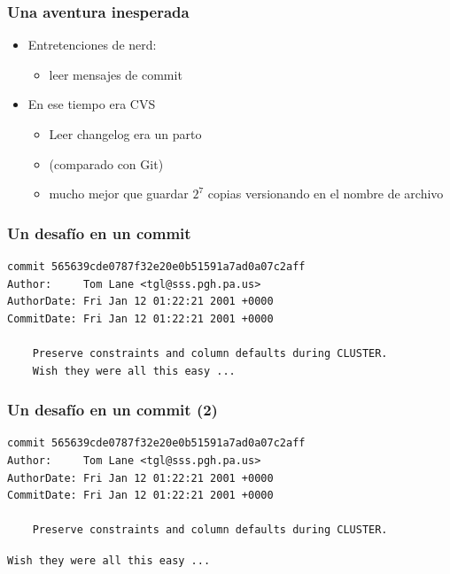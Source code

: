 \begin{frame}
  \frametitle{Una aventura inesperada}
	\begin{itemize}
		\item Entretenciones de nerd:
			\begin{itemize}
				\item leer mensajes de commit
			\end{itemize}
		\item En ese tiempo era CVS
			\begin{itemize}
				\item Leer changelog era un parto
				\item (comparado con Git)
				\item mucho mejor que guardar $2^7$ copias versionando en el nombre de archivo
			\end{itemize}
	\end{itemize}
\end{frame}

\begin{frame}[containsverbatim]
  \frametitle{Un desafío en un commit}

\footnotesize
\begin{Verbatim}[xleftmargin=-0.7cm]
commit 565639cde0787f32e20e0b51591a7ad0a07c2aff
Author:     Tom Lane <tgl@sss.pgh.pa.us>
AuthorDate: Fri Jan 12 01:22:21 2001 +0000
CommitDate: Fri Jan 12 01:22:21 2001 +0000

    Preserve constraints and column defaults during CLUSTER.
    Wish they were all this easy ...
\end{Verbatim}
\end{frame}

\begin{frame}[containsverbatim]
  \frametitle{Un desafío en un commit (2)}

\footnotesize
\begin{Verbatim}[xleftmargin=-0.7cm]
commit 565639cde0787f32e20e0b51591a7ad0a07c2aff
Author:     Tom Lane <tgl@sss.pgh.pa.us>
AuthorDate: Fri Jan 12 01:22:21 2001 +0000
CommitDate: Fri Jan 12 01:22:21 2001 +0000

    Preserve constraints and column defaults during CLUSTER.
\end{Verbatim}
	\Huge
	\alert{\texttt{Wish they were all this easy ...}}
\end{frame}


